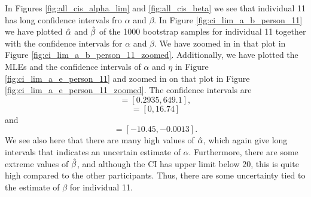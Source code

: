 In Figures \ref{fig:all_cis_alpha_lim} and \ref{fig:all_cis_beta} we see that individual 11 has long confidence intervals fro $\alpha$ and $\beta$. In Figure \ref{fig:ci_lim_a_b_person_11} we have plotted $\hat{\alpha}$ and $\hat{\beta}$ of the 1000 bootstrap samples for individual 11 together with the confidence intervals for $\alpha$ and $\beta$.
We have zoomed in in that plot in Figure \ref{fig:ci_lim_a_b_person_11_zoomed}. Additionally, we have plotted the MLEs and the confidence intervals of $\alpha$ and $\eta$ in Figure \ref{fig:ci_lim_a_e_person_11} and zoomed in on that plot in Figure \ref{fig:ci_lim_a_e_person_11_zoomed}.
The confidence intervals are 
\begin{equation*}
    [\hat{\alpha}^{*(5)}_{1000},\hat{\alpha}^{*(95)}_{1000}] = [0.2935,649.1],
\end{equation*}
\begin{equation*}
    [\hb^{*(5)}_{1000},\hb^{*(95)}_{1000}] = [0,16.74]
\end{equation*}
and
\begin{equation*}
    [\hat{\eta}^{*(5)}_{1000},\hat{\eta}^{*(95)}_{1000}] = [-10.45,-0.0013].
\end{equation*}
We see also here that there are many high values of $\hat{\alpha}$, which again give long intervals that indicates an uncertain estimate of $\alpha$. Furthermore, there are some extreme values of $\hat{\beta}$, and although the CI has upper limit below 20, this is quite high compared to the other participants. Thus, there are some uncertainty tied to the estimate of $\beta$ for individual 11. 
